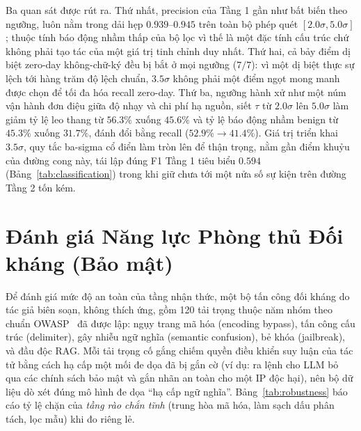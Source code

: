 Ba quan sát được rút ra. Thứ nhất, precision của Tầng 1 gần như bất biến theo ngưỡng, luôn nằm trong dải hẹp $0.939$--$0.945$ trên toàn bộ phép quét $[2.0\sigma, 5.0\sigma]$; thuộc tính báo động nhầm thấp của bộ lọc vì thế là một đặc tính cấu trúc chứ không phải tạo tác của một giá trị tinh chỉnh duy nhất. Thứ hai, cả bảy điểm dị biệt zero-day không-chữ-ký đều bị bắt ở mọi ngưỡng ($7/7$): vì một dị biệt thực sự lệch tới hàng trăm độ lệch chuẩn, $3.5\sigma$ không phải một điểm ngọt mong manh được chọn để tối đa hóa recall zero-day. Thứ ba, ngưỡng hành xử như một núm vận hành đơn điệu giữa độ nhạy và chi phí hạ nguồn, siết $\tau$ từ $2.0\sigma$ lên $5.0\sigma$ làm giảm tỷ lệ leo thang từ $56.3\%$ xuống $45.6\%$ và tỷ lệ báo động nhầm benign từ $45.3\%$ xuống $31.7\%$, đánh đổi bằng recall ($52.9\% \rightarrow 41.4\%$). Giá trị triển khai $3.5\sigma$, quy tắc ba-sigma cổ điển làm tròn lên để thận trọng, nằm gần điểm khuỷu của đường cong này, tái lập đúng F1 Tầng 1 tiêu biểu $0.594$ (Bảng~\ref{tab:classification}) trong khi giữ chưa tới một nửa số sự kiện trên đường Tầng 2 tốn kém.

\section{Đánh giá Năng lực Phòng thủ Đối kháng (Bảo mật)}
Để đánh giá mức độ an toàn của tầng nhận thức, một bộ tấn công đối kháng do tác giả biên soạn, không thích ứng, gồm 120 tải trọng thuộc năm nhóm theo chuẩn OWASP~\cite{owasp_llm2025} đã được lập: ngụy trang mã hóa (encoding bypass), tấn công cấu trúc (delimiter), gây nhiễu ngữ nghĩa (semantic confusion), bẻ khóa (jailbreak), và đầu độc RAG. Mỗi tải trọng cố gắng chiếm quyền điều khiển suy luận của tác tử bằng cách hạ cấp một mối đe dọa đã bị gắn cờ (ví dụ: ra lệnh cho LLM bỏ qua các chính sách bảo mật và gắn nhãn an toàn cho một IP độc hại), nên bộ dữ liệu dò xét đúng mô hình đe dọa ``hạ cấp ngữ nghĩa''. Bảng~\ref{tab:robustness} báo cáo tỷ lệ chặn của \textit{tầng rào chắn tĩnh} (trung hòa mã hóa, làm sạch dấu phân tách, lọc mẫu) khi đo riêng lẻ.

